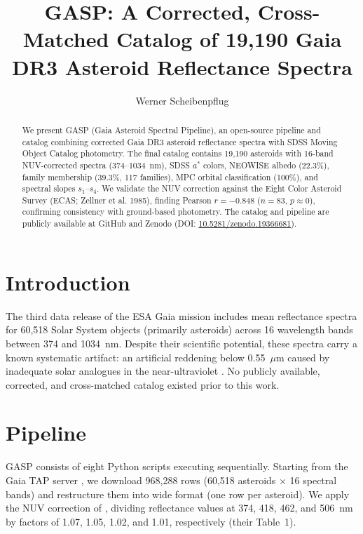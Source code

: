 \documentclass[modern]{aastex631}
\begin{document}
\title{GASP: A Corrected, Cross-Matched Catalog of 19,190 
       Gaia DR3 Asteroid Reflectance Spectra}

\author{Werner Scheibenpflug}

\begin{abstract}
We present GASP (Gaia Asteroid Spectral Pipeline), an open-source
pipeline and catalog combining corrected Gaia DR3 asteroid
reflectance spectra with SDSS Moving Object Catalog photometry.
The final catalog contains 19,190 asteroids with 16-band
NUV-corrected spectra (374--1034~nm), SDSS $a^*$ colors,
NEOWISE albedo (22.3\%), family membership (39.3\%, 117 families),
MPC orbital classification (100\%), and spectral slopes $s_1$--$s_4$.
We validate the NUV correction against the Eight Color Asteroid
Survey (ECAS; Zellner et al. 1985), finding Pearson
$r = -0.848$ ($n=83$, $p \approx 0$), confirming consistency
with ground-based photometry. The catalog and pipeline are
publicly available at GitHub and Zenodo
(DOI: \href{https://doi.org/10.5281/zenodo.19366681}
{10.5281/zenodo.19366681}).
\end{abstract}


\section{Introduction}

The third data release of the ESA Gaia mission
\citep[Gaia DR3;][]{GaiaDR3_2023} includes mean reflectance
spectra for 60,518 Solar System objects (primarily asteroids)
across 16 wavelength bands between 374 and 1034~nm. Despite
their scientific potential, these spectra carry a known
systematic artifact: an artificial reddening below 0.55~$\mu$m
caused by inadequate solar analogues in the near-ultraviolet
\citep[NUV;][]{TinautRuano2023}. No publicly available,
corrected, and cross-matched catalog existed prior to this work.

\section{Pipeline}

GASP consists of eight Python scripts executing sequentially.
Starting from the Gaia TAP server \citep{GaiaArchive2024},
we download 968,288 rows (60,518 asteroids $\times$ 16 spectral
bands) and restructure them into wide format (one row per asteroid).
We apply the NUV correction of \citet{TinautRuano2023}, dividing
reflectance values at 374, 418, 462, and 506~nm by factors of
1.07, 1.05, 1.02, and 1.01, respectively (their Table~1).
\end{document}
